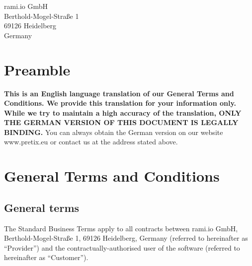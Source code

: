 \documentclass{terms}
\begin{document}
\maketitle

\begin{center}
rami.io GmbH\\
Berthold-Mogel-Straße 1\\
69126 Heidelberg\\
Germany
\end{center}
\sloppy

\section*{Preamble}

\textbf{This is an English language translation of our General Terms and Conditions. We provide this translation for your information only. While we try to maintain a high accuracy of the translation, ONLY THE GERMAN VERSION OF THIS DOCUMENT IS LEGALLY BINDING.}
You can always obtain the German version on our website www.pretix.eu or contact us at the address stated above.

\section{General Terms and Conditions}
\subsection{General terms}
The Standard Business Terms apply to all contracts between rami.io GmbH, Berthold-Mogel-Straße 1, 69126 Heidelberg, Germany (referred to hereinafter as “Provider”) and the contractually-authorised user of the software (referred to hereinafter as “Customer”).
\end{document}
